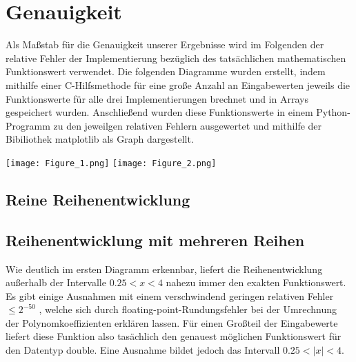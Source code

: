 \documentclass[course=erap] {aspdoc}
\begin{document}
 
     \section{Genauigkeit}
     Als Maßstab für die Genauigkeit unserer Ergebnisse wird im Folgenden der relative Fehler der Implementierung bezüglich des tatsächlichen mathematischen Funktionswert verwendet. Die folgenden Diagramme wurden erstellt, indem mithilfe einer C-Hilfsmethode für eine große Anzahl an Eingabewerten jeweils die Funktionswerte für alle drei Implementierungen brechnet und in Arrays gespeichert wurden. Anschließend wurden diese Funktionswerte in einem Python-Programm zu den jeweilgen relativen Fehlern ausgewertet und mithilfe der Bibiliothek matplotlib als Graph dargestellt.
 
     \texttt{[image: Figure\_1.png]}
     \texttt{[image: Figure\_2.png]}
     
     \subsection{Reine Reihenentwicklung}
     
 
 
     
     \subsection{Reihenentwicklung mit mehreren Reihen}
     Wie deutlich im ersten Diagramm erkennbar, liefert die Reihenentwicklung außerhalb der Intervalle $0.25<x<4$ nahezu immer den exakten Funktionswert. Es gibt einige Ausnahmen mit einem verschwindend geringen relativen Fehler $\leq2^{-50}$ , welche sich durch floating-point-Rundungsfehler bei der Umrechnung der Polynomkoeffizienten erklären lassen.
     Für einen Großteil der Eingabewerte liefert diese Funktion also tasächlich den genauest möglichen Funktionswert für den Datentyp double. Eine Ausnahme bildet jedoch das Intervall $0.25<|x|<4$. 
     
\end{document}
